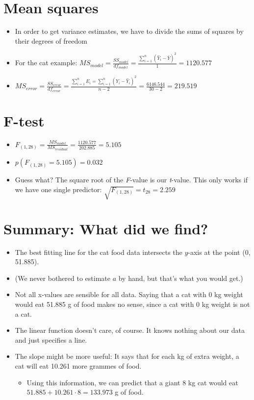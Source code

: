 \documentclass[]{article}
\providecommand{\tightlist}{%
  \setlength{\itemsep}{0pt}\setlength{\parskip}{0pt}}
\begin{document}
\section{Mean squares}\label{mean-squares}

\begin{itemize}
\tightlist
\item
  In order to get variance estimates, we have to divide the sums of
  squares by their degrees of freedom
\item
  For the cat example:
  \(MS_{model} = \frac{SS_{model}}{df_{model}} = \frac{\sum\limits_{i=1}^{n}(\hat{Y}_i - \bar{Y})^2}{1} = 1120.577\)
\item
  \(MS_{error} = \frac{SS_{error}}{df_{error}} = \frac{\sum\limits_{i=1}^{n}E_i = \sum\limits_{i=1}^{n}(Y_i - \hat{Y}_i)^2}{n-2} = \frac{6146.544}{30 - 2} = 219.519\)
\end{itemize}

\section{F-test}\label{f-test}

\begin{itemize}
\tightlist
\item
  \(F_{(1, 28)} = \frac{MS_{model}}{MS_{residual}} = \frac{1120.577}{202.885} = 5.105\)
\item
  \(p(F_{(1, 28)} = 5.105) = 0.032\)
\item
  Guess what? The square root of the \emph{F}-value is our
  \emph{t}-value. This only works if we have one single predictor:
  \(\sqrt{F_{(1,28)}} = t_{28} = 2.259\)
\end{itemize}

\section{Summary: What did we find?}\label{summary-what-did-we-find}

\begin{itemize}
\tightlist
\item
  The best fitting line for the cat food data intersects the \(y\)-axis
  at the point (0, 51.885).
\item
  (We never bothered to estimate \(a\) by hand, but that's what you
  would get.)
\item
  Not all x-values are sensible for all data. Saying that a cat with 0
  kg weight would eat 51.885 g of food makes no sense, since a cat with
  0 kg weight is not a cat.
\item
  The linear function doesn't care, of course. It knows nothing about
  our data and just specifies a line.
\item
  The slope might be more useful: It says that for each kg of extra
  weight, a cat will eat 10.261 more grammes of food.

  \begin{itemize}
  \tightlist
  \item
    Using this information, we can predict that a giant 8 kg cat would
    eat \(51.885 + 10.261 \cdot 8 = 133.973\) g of food.
  \end{itemize}
\end{itemize}
\end{document}
